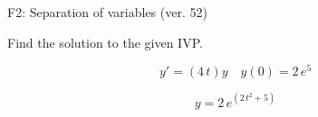 \begin{exercise}
  \begin{exerciseTitle}F2: Separation of variables (ver. 52)\end{exerciseTitle}
  \begin{exerciseStatement}
    
Find the solution to the given IVP.

    
\[y'=( 4 \, t )y\hspace{1em} y(0)= 2 \, e^{5}\]

  \end{exerciseStatement}
  \begin{exerciseAnswer}
    
\[y= 2 \, e^{\left(2 \, t^{2} + 5\right)}\]

  \end{exerciseAnswer}
\end{exercise}